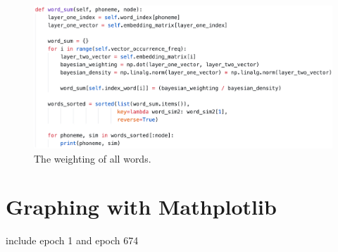 \begin{figure}[H]
    \centering
    \includegraphics[width=\textwidth]{figures/chapter-6/wordsum.png}
    \caption[The weighting of all words]{The weighting of all words.
    \label{fig:wordsum}}
\end{figure}

\section{Graphing with Mathplotlib}

include epoch 1 and epoch 674